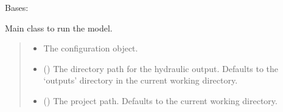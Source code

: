 \documentclass[a4paper,11pt,english,openany]{sphinxmanual}
\begin{document}
\begin{fulllineitems}
\label{\detokenize{api/spyice.main_process:src.spyice.main_process.MainProcess}}
\pysigstartsignatures
\pysigline
{}
\pysigstopsignatures
\sphinxAtStartPar
Bases: 

\sphinxAtStartPar
Main class to run the model.
\begin{quote}\begin{description}
\begin{itemize}
\item {} 
\sphinxAtStartPar
{} \textendash{} The configuration object.

\item {} 
\sphinxAtStartPar
{} (\sphinxstyleliteralemphasis{\sphinxupquote{ | }}) \textendash{} The directory path for the hydraulic output. Defaults to the ‘outputs’ directory in the current working directory.

\item {} 
\sphinxAtStartPar
{} (\sphinxstyleliteralemphasis{\sphinxupquote{ | }}) \textendash{} The project path. Defaults to the current working directory.

\end{itemize}

\end{description}\end{quote}


\end{fulllineitems}
\end{document}
